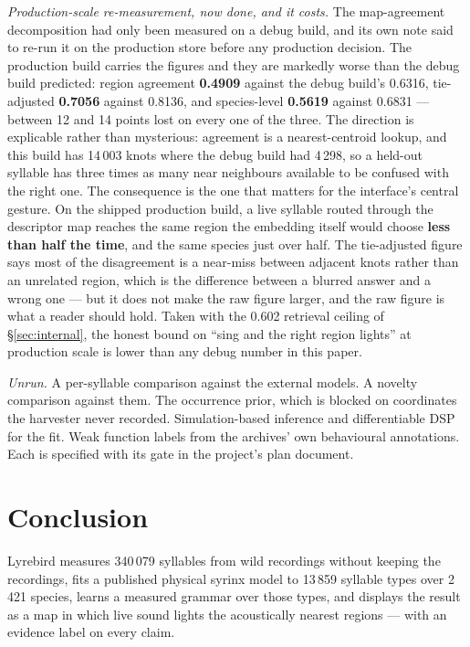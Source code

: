 \documentclass[10pt,twocolumn,a4paper]{article}
\begin{document}
\emph{Production-scale re-measurement, now done, and it costs.} The map-agreement
decomposition had only been measured on a debug build, and its own note said to re-run it on
the production store before any production decision. The production build carries the figures
and they are markedly worse than the debug build predicted: region agreement
\textbf{0.4909} against the debug build's 0.6316, tie-adjusted \textbf{0.7056} against
0.8136, and species-level \textbf{0.5619} against 0.6831 --- between 12 and 14 points lost on
every one of the three. The direction is explicable rather than mysterious: agreement is a
nearest-centroid lookup, and this build has 14\,003 knots where the debug build had 4\,298, so
a held-out syllable has three times as many near neighbours available to be confused with the
right one. The consequence is the one that matters for the interface's central gesture. On the
shipped production build, a live syllable routed through the descriptor map reaches the same
region the embedding itself would choose \textbf{less than half the time}, and the same species
just over half. The tie-adjusted figure says most of the disagreement is a near-miss between
adjacent knots rather than an unrelated region, which is the difference between a blurred
answer and a wrong one --- but it does not make the raw figure larger, and the raw figure is
what a reader should hold. Taken with the 0.602 retrieval ceiling of
\S\ref{sec:internal}, the honest bound on ``sing and the right region lights'' at
production scale is lower than any debug number in this paper.

\emph{Unrun.} A per-syllable comparison against the external models. A novelty comparison
against them. The occurrence prior, which is blocked on coordinates the harvester never
recorded. Simulation-based inference and differentiable DSP for the fit. Weak function labels
from the archives' own behavioural annotations. Each is specified with its gate in the
project's plan document.

\section{Conclusion}

Lyrebird measures 340\,079 syllables from wild recordings without keeping the recordings,
fits a published physical syrinx model to 13\,859 syllable types over 2\,421 species, learns a
measured grammar over those types, and displays the result as a map in which live sound lights
the acoustically nearest regions --- with an evidence label on every claim.
\end{document}
